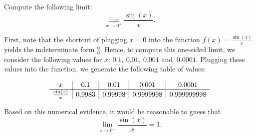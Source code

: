 \documentclass[handout]{ximera}
\begin{document}
\begin{example}[example 4]
Compute the following limit: 
\[\lim_{x \to 0^+} \frac{\sin(x)}{x}.\]

First, note that the shortcut of plugging $x=0$ into the 
function $\displaystyle{f(x)= \frac{\sin(x)}{x}}$ yields the indeterminate form $\frac{0}{0}$.
Hence, to compute this one-sided limit, we consider the following values for $x$: $0.1,\ 0.01,\ 0.001$ and $\ 0.0001$.
Plugging these values into the function, we generate the following table of values:

\[
\begin{array}{ c | c | c | c | c }
  x & 0.1 & 0.01  & 0.001 & 0.0001 \\ 
	\hline 
	 \frac{\sin(x)}{x} & 0.9983 & 0.99998 & 0.9999998 & 0.999999998
\end{array}
\]  

Based on this numerical evidence, 
it would be reasonable to guess that 
\[\lim_{x \to 0^{+}} \frac{\sin(x)}{x} = 1.\]













\end{example}

	   
\end{document}
